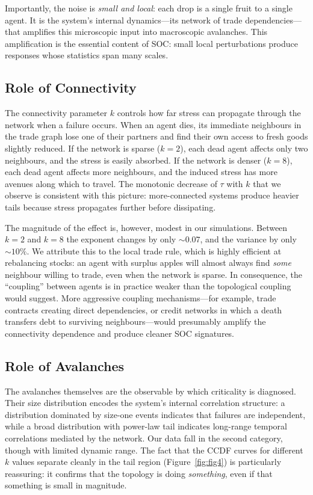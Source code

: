 \documentclass[11pt,a4paper]{article}
\begin{document}
Importantly, the noise is \emph{small and local}: each drop is a single
fruit to a single agent. It is the system's internal dynamics---its
network of trade dependencies---that amplifies this microscopic input into
macroscopic avalanches. This amplification is the essential content of
SOC: small local perturbations produce responses whose statistics span
many scales.

\subsection{Role of Connectivity}

The connectivity parameter $k$ controls how far stress can propagate
through the network when a failure occurs. When an agent dies, its
immediate neighbours in the trade graph lose one of their partners and
find their own access to fresh goods slightly reduced. If the network is
sparse ($k=2$), each dead agent affects only two neighbours, and the
stress is easily absorbed. If the network is denser ($k=8$), each dead
agent affects more neighbours, and the induced stress has more avenues
along which to travel. The monotonic decrease of $\tau$ with $k$ that we
observe is consistent with this picture: more-connected systems produce
heavier tails because stress propagates further before dissipating.

The magnitude of the effect is, however, modest in our simulations.
Between $k=2$ and $k=8$ the exponent changes by only $\sim 0.07$, and the
variance by only $\sim 10\%$. We attribute this to the local trade rule,
which is highly efficient at rebalancing stocks: an agent with surplus
apples will almost always find \emph{some} neighbour willing to trade,
even when the network is sparse. In consequence, the ``coupling'' between
agents is in practice weaker than the topological coupling would suggest.
More aggressive coupling mechanisms---for example, trade contracts
creating direct dependencies, or credit networks in which a death
transfers debt to surviving neighbours---would presumably amplify the
connectivity dependence and produce cleaner SOC signatures.

\subsection{Role of Avalanches}

The avalanches themselves are the observable by which criticality is
diagnosed. Their size distribution encodes the system's internal
correlation structure: a distribution dominated by size-one events
indicates that failures are independent, while a broad distribution with
power-law tail indicates long-range temporal correlations mediated by the
network. Our data fall in the second category, though with limited
dynamic range. The fact that the CCDF curves for different $k$ values
separate cleanly in the tail region (Figure~\ref{fig:fig4}) is
particularly reassuring: it confirms that the topology is doing
\emph{something}, even if that something is small in magnitude.
\end{document}
